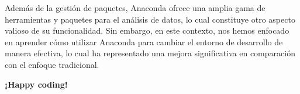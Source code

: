 \documentclass[
  a4paper,
]{article}
\begin{document}
Además de la gestión de paquetes, Anaconda ofrece una amplia gama de
herramientas y paquetes para el análisis de datos, lo cual constituye
otro aspecto valioso de su funcionalidad. Sin embargo, en este contexto,
nos hemos enfocado en aprender cómo utilizar Anaconda para cambiar el
entorno de desarrollo de manera efectiva, lo cual ha representado una
mejora significativa en comparación con el enfoque tradicional.

\textbf{¡Happy coding!}


\printbibliography
\end{document}
